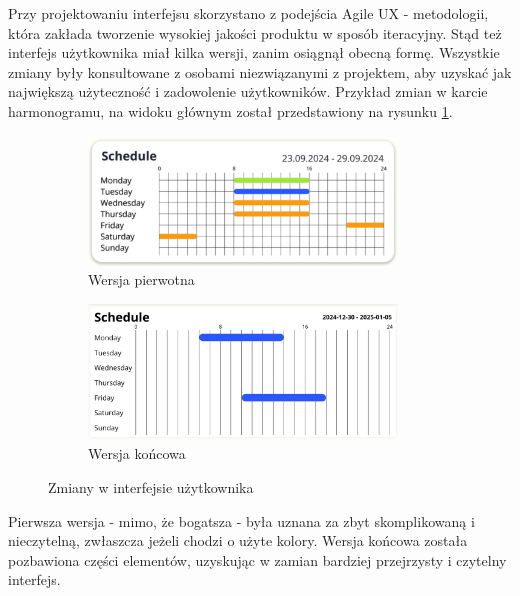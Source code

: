 Przy projektowaniu interfejsu skorzystano z podejścia Agile UX - metodologii, która zakłada tworzenie wysokiej jakości produktu w sposób iteracyjny. Stąd też interfejs użytkownika miał kilka wersji, zanim osiągnął obecną formę. Wszystkie zmiany były konsultowane z osobami niezwiązanymi z projektem, aby uzyskać jak największą użyteczność i zadowolenie użytkowników. Przykład zmian w karcie harmonogramu, na widoku głównym został przedstawiony na rysunku \ref{fig:uxChanges}.

\begin{figure}[H]
    \centering
    \begin{subfigure}[b]{0.49\textwidth}
        \centering
        \includegraphics[width=0.9\textwidth, frame]{graf/sch1.png}
        \caption{Wersja pierwotna}
    \end{subfigure}
    \begin{subfigure}[b]{0.49\textwidth}
        \centering
        \includegraphics[width=0.9\textwidth, frame]{graf/schE.png}
        \caption{Wersja końcowa}
    \end{subfigure}
    \caption{Zmiany w interfejsie użytkownika}
    \label{fig:uxChanges}
\end{figure}

Pierwsza wersja - mimo, że bogatsza - była uznana za zbyt skomplikowaną i nieczytelną, zwłaszcza jeżeli chodzi o użyte kolory. Wersja końcowa została pozbawiona części elementów, uzyskując w zamian bardziej przejrzysty i czytelny interfejs.

